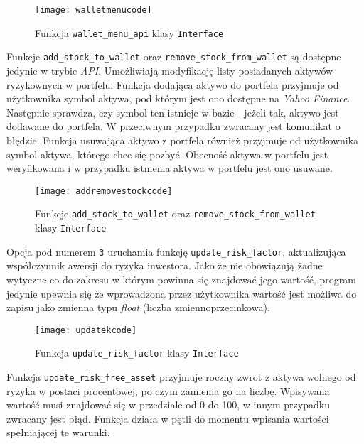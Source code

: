 \documentclass[magister]{dyplom}
\def\code#1{\texttt{#1}}
\begin{document}
\begin{figure}[ht]
	\centering
	\texttt{[image: walletmenucode]}
	\caption{Funkcja \code{wallet\_menu\_api} klasy \code{Interface}}
\end{figure}

Funkcje \code{add\_stock\_to\_wallet} oraz \code{remove\_stock\_from\_wallet} są dostępne jedynie w trybie \textit{API}. Umożliwiają modyfikację listy posiadanych aktywów ryzykownych w portfelu. Funkcja dodająca aktywo do portfela przyjmuje od użytkownika symbol aktywa, pod którym jest ono dostępne na \textit{Yahoo Finance}. Następnie sprawdza, czy symbol ten istnieje w bazie - jeżeli tak, aktywo jest dodawane do portfela. W przeciwnym przypadku zwracany jest komunikat o błędzie.
Funkcja usuwająca aktywo z portfela również przyjmuje od użytkownika symbol aktywa, którego chce się pozbyć. Obecność aktywa w portfelu jest weryfikowana i w przypadku istnienia aktywa w portfelu jest ono usuwane.

\begin{figure}[ht]
	\centering
	\texttt{[image: addremovestockcode]}
	\caption{Funkcje \code{add\_stock\_to\_wallet} oraz \code{remove\_stock\_from\_wallet} klasy \code{Interface}}
\end{figure}

Opcja pod numerem \code{3} uruchamia funkcję \code{update\_risk\_factor}, aktualizująca współczynnik awersji do ryzyka inwestora. Jako że nie obowiązują żadne wytyczne co do zakresu w którym powinna się znajdować jego wartość, program jedynie upewnia się że wprowadzona przez użytkownika wartość jest możliwa do zapisu jako zmienna typu \textit{float} (liczba zmiennoprzecinkowa).

\begin{figure}[ht]
	\centering
	\texttt{[image: updatekcode]}
	\caption{Funkcja \code{update\_risk\_factor} klasy \code{Interface}}
\end{figure}

Funkcja \code{update\_risk\_free\_asset} przyjmuje roczny zwrot z aktywa wolnego od ryzyka w postaci procentowej, po czym zamienia go na liczbę. Wpisywana wartość musi znajdować się w przedziale od 0 do 100, w innym przypadku zwracany jest błąd. Funkcja działa w pętli do momentu wpisania wartości spełniającej te warunki.
\end{document}
